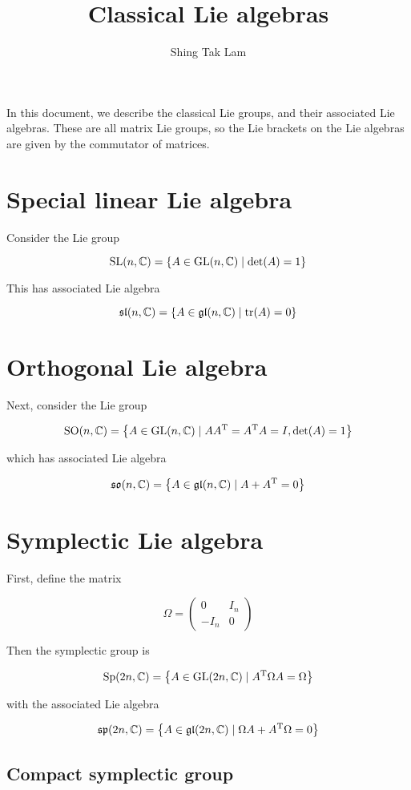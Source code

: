 \documentclass{article}
\title{Classical Lie algebras}
\author{Shing Tak Lam}
\renewcommand{\sl}{\mfs\mfl}
\newcommand{\so}{\mfs\mfo}
\DeclareMathOperator{\Sp}{Sp}
\renewcommand{\sp}{\mfs\mfp}
\DeclareMathOperator{\SO}{SO}
\begin{document}
\maketitle

In this document, we describe the classical Lie groups, and their associated Lie algebras. These are all matrix Lie groups, so the Lie brackets on the Lie algebras are given by the commutator of matrices.

\section{Special linear Lie algebra}

Consider the Lie group

\[\operatorname{SL}(n, \mathbb{C}) = \left\{A \in \operatorname{GL}(n, \mathbb{C}) \mid \det(A) = 1\right\}\]

This has associated Lie algebra

\[\sl(n, \C) = \left\{A \in \gl(n, \C) \mid \tr(A) = 0\right\}\]

\section{Orthogonal Lie algebra}

Next, consider the Lie group

\[\SO(n, \C) = \left\{A \in \GL(n, \C) \mid AA^\T = A^\T A = I, \det(A) = 1\right\}\]

which has associated Lie algebra

\[\so(n, \C) = \left\{A \in \gl(n, \C) \mid A + A^\T = 0\right\}\]

\section{Symplectic Lie algebra}

First, define the matrix

\[\Omega = \begin{pmatrix}
    0 & I_n \\
    -I_n & 0
\end{pmatrix}\]

Then the symplectic group is 

\[\Sp(2n, \C) = \left\{A \in \GL(2n, \C) \mid A^\T \Omega A = \Omega\right\}\]

with the associated Lie algebra

\[\sp(2n, \C) = \left\{A \in \gl(2n, \C) \mid \Omega A + A^\T \Omega = 0\right\}\]

\subsection{Compact symplectic group}
\end{document}
